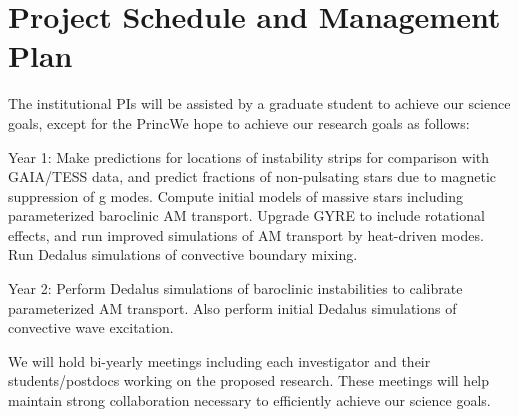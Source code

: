\section{Project Schedule and Management Plan}

The institutional PIs will be assisted by a graduate student to achieve our science goals, except for the PrincWe hope to achieve our research goals as follows:

Year 1: Make predictions for locations of instability strips for comparison with GAIA/TESS data, and predict fractions of non-pulsating stars due to magnetic suppression of g modes. Compute initial models of massive stars including parameterized baroclinic AM transport. Upgrade GYRE to include rotational effects, and run improved simulations of AM transport by heat-driven modes. Run Dedalus simulations of convective boundary mixing.

Year 2: Perform Dedalus simulations of baroclinic instabilities to calibrate parameterized AM transport. Also perform initial Dedalus simulations of convective wave excitation. 

We will  hold bi-yearly meetings including each investigator and their students/postdocs working on the proposed research. These meetings will help maintain strong collaboration necessary to efficiently achieve our science goals.

